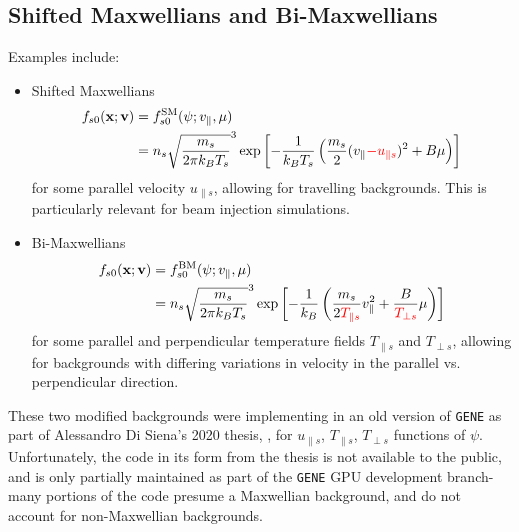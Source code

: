 \subsection{Shifted Maxwellians and Bi-Maxwellians}
    Examples include:
    \begin{itemize}
        \item  Shifted Maxwellians
        \begin{align}
            f_{s0}(\mathbf{x}; \mathbf{v})  &=  f_{s0}^{\rm SM}(\psi; v_{\parallel}, \mu)  \\
            &=  n_{s}\sqrt{\frac{m_{s}}{2\pi k_{B}T_{s}}}^{3}\exp\left[- \frac{1}{k_{B}T_{s}}\left(\frac{m_{s}}{2}(v_{\parallel} \textcolor{red}{- u_{\parallel s}})^{2} + B\mu\right)\right]
        \end{align}
        for some parallel velocity $u_{\parallel s}$, allowing for travelling backgrounds. This is particularly relevant for beam injection simulations.

        \item  Bi-Maxwellians
        \begin{align}
            f_{s0}(\mathbf{x}; \mathbf{v})  &=  f_{s0}^{\rm BM}(\psi; v_{\parallel}, \mu)  \\
            &=  n_{s}\sqrt{\frac{m_{s}}{2\pi k_{B}T_{s}}}^{3}\exp\left[- \frac{1}{k_{B}}\left(\frac{m_{s}}{2\textcolor{red}{T_{\parallel s}}}v_{\parallel}^{2} + \frac{B}{\textcolor{red}{T_{\perp s}}}\mu\right)\right]
        \end{align}
        for some parallel and perpendicular temperature fields $T_{\parallel s}$ and $T_{\perp s}$, allowing for backgrounds with differing variations in velocity in the parallel vs. perpendicular direction. 
    \end{itemize}
    These two modified backgrounds were implementing in an old version of {\tt GENE} as part of Alessandro Di Siena's 2020 thesis, \cite{Di20}, for $u_{\parallel s}$, $T_{\parallel s}$, $T_{\perp s}$ functions of $\psi$. Unfortunately, the code in its form from the thesis is not available to the public, and is only partially maintained as part of the {\tt GENE} GPU development branch- many portions of the code presume a Maxwellian background, and do not account for non-Maxwellian backgrounds.
